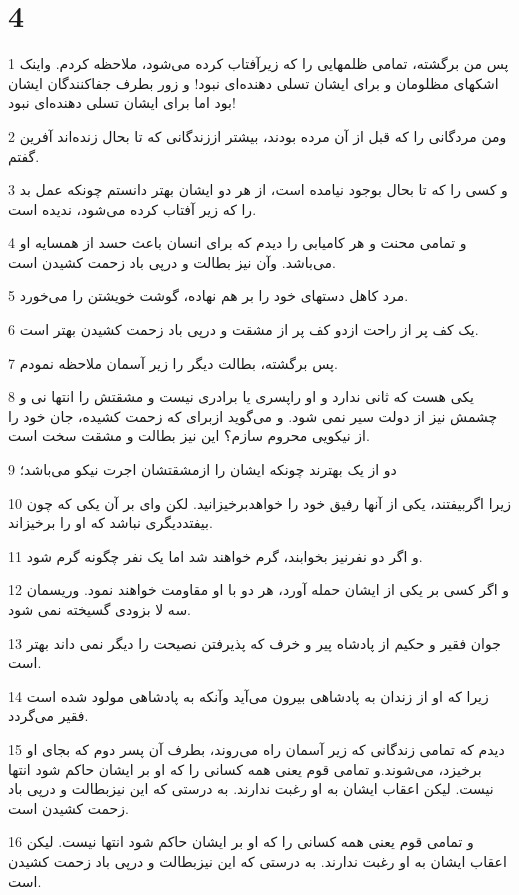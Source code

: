 \chapter{4}

\par 1 پس من برگشته، تمامی ظلمهایی را که زیرآفتاب کرده می‌شود، ملاحظه کردم. واینک اشکهای مظلومان و برای ایشان تسلی دهنده‌ای نبود! و زور بطرف جفاکنندگان ایشان بود اما برای ایشان تسلی دهنده‌ای نبود!
\par 2 ومن مردگانی را که قبل از آن مرده بودند، بیشتر اززندگانی که تا بحال زنده‌اند آفرین گفتم.
\par 3 و کسی را که تا بحال بوجود نیامده است، از هر دو ایشان بهتر دانستم چونکه عمل بد را که زیر آفتاب کرده می‌شود، ندیده است.
\par 4 و تمامی محنت و هر کامیابی را دیدم که برای انسان باعث حسد از همسایه او می‌باشد. وآن نیز بطالت و در‌پی باد زحمت کشیدن است.
\par 5 مرد کاهل دستهای خود را بر هم نهاده، گوشت خویشتن را می‌خورد.
\par 6 یک کف پر از راحت ازدو کف پر از مشقت و در‌پی باد زحمت کشیدن بهتر است.
\par 7 پس برگشته، بطالت دیگر را زیر آسمان ملاحظه نمودم.
\par 8 یکی هست که ثانی ندارد و او راپسری یا برادری نیست و مشقتش را انتها نی و چشمش نیز از دولت سیر نمی شود. و می‌گوید ازبرای که زحمت کشیده، جان خود را از نیکویی محروم سازم؟ این نیز بطالت و مشقت سخت است.
\par 9 دو از یک بهترند چونکه ایشان را ازمشقتشان اجرت نیکو می‌باشد؛
\par 10 زیرا اگربیفتند، یکی از آنها رفیق خود را خواهدبرخیزانید. لکن وای بر آن یکی که چون بیفتددیگری نباشد که او را برخیزاند.
\par 11 و اگر دو نفرنیز بخوابند، گرم خواهند شد اما یک نفر چگونه گرم شود.
\par 12 و اگر کسی بر یکی از ایشان حمله آورد، هر دو با او مقاومت خواهند نمود. وریسمان سه لا بزودی گسیخته نمی شود.
\par 13 جوان فقیر و حکیم از پادشاه پیر و خرف که پذیرفتن نصیحت را دیگر نمی داند بهتر است.
\par 14 زیرا که او از زندان به پادشاهی بیرون می‌آید وآنکه به پادشاهی مولود شده است فقیر می‌گردد.
\par 15 دیدم که تمامی زندگانی که زیر آسمان راه می‌روند، بطرف آن پسر دوم که بجای او برخیزد، می‌شوند.و تمامی قوم یعنی همه کسانی را که او بر ایشان حاکم شود انتها نیست. لیکن اعقاب ایشان به او رغبت ندارند. به درستی که این نیزبطالت و در‌پی باد زحمت کشیدن است.
\par 16 و تمامی قوم یعنی همه کسانی را که او بر ایشان حاکم شود انتها نیست. لیکن اعقاب ایشان به او رغبت ندارند. به درستی که این نیزبطالت و در‌پی باد زحمت کشیدن است.
 
